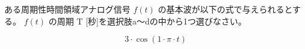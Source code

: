 ある周期性時間領域アナログ信号 $f(t)$ の基本波が以下の式で与えられるとする。
$f(t)$ の周期 $\textrm{T}$ [秒]を選択肢a〜dの中から1つ選びなさい。

\[
3 \cdot \cos( 1 \cdot \pi \cdot t)
\]
